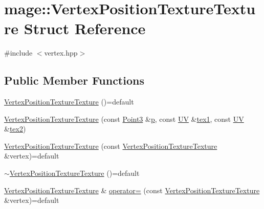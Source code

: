 \hypertarget{structmage_1_1_vertex_position_texture_texture}{}\section{mage\+:\+:Vertex\+Position\+Texture\+Texture Struct Reference}
\label{structmage_1_1_vertex_position_texture_texture}


{\ttfamily \#include $<$vertex.\+hpp$>$}

\subsection*{Public Member Functions}
\begin{DoxyCompactItemize}
\item 
\hyperlink{structmage_1_1_vertex_position_texture_texture_a4dd987362b64d278569f9bd043e2cb8b}{Vertex\+Position\+Texture\+Texture} ()=default
\item 
\hyperlink{structmage_1_1_vertex_position_texture_texture_a7f7d47e614c6eafddc6fa63f47a0b7c1}{Vertex\+Position\+Texture\+Texture} (const \hyperlink{structmage_1_1_point3}{Point3} \&\hyperlink{structmage_1_1_vertex_position_texture_texture_aed106149eda65a20e60ebc3b93535270}{p}, const \hyperlink{structmage_1_1_u_v}{UV} \&\hyperlink{structmage_1_1_vertex_position_texture_texture_a96be20a1f6ec9b9b74875099eef80f08}{tex1}, const \hyperlink{structmage_1_1_u_v}{UV} \&\hyperlink{structmage_1_1_vertex_position_texture_texture_a5a41669f18385d932c1490ff20c80bed}{tex2})
\item 
\hyperlink{structmage_1_1_vertex_position_texture_texture_a753bdeb0b5b4ea7fff5bdd4ae21a0c16}{Vertex\+Position\+Texture\+Texture} (const \hyperlink{structmage_1_1_vertex_position_texture_texture}{Vertex\+Position\+Texture\+Texture} \&vertex)=default
\item 
\hyperlink{structmage_1_1_vertex_position_texture_texture_a861ed56f084a3385429eae5783178529}{$\sim$\+Vertex\+Position\+Texture\+Texture} ()=default
\item 
\hyperlink{structmage_1_1_vertex_position_texture_texture}{Vertex\+Position\+Texture\+Texture} \& \hyperlink{structmage_1_1_vertex_position_texture_texture_a6880fca48f99b6a3360a41f05ca7f9fc}{operator=} (const \hyperlink{structmage_1_1_vertex_position_texture_texture}{Vertex\+Position\+Texture\+Texture} \&vertex)=default
\end{DoxyCompactItemize}

